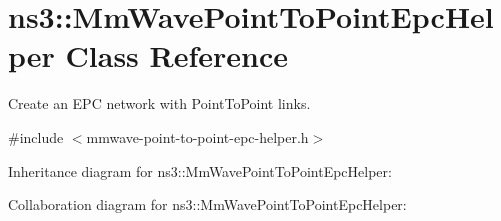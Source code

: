 \hypertarget{classns3_1_1MmWavePointToPointEpcHelper}{}\section{ns3\+:\+:Mm\+Wave\+Point\+To\+Point\+Epc\+Helper Class Reference}
\label{classns3_1_1MmWavePointToPointEpcHelper}


Create an E\+PC network with Point\+To\+Point links.  




{\ttfamily \#include $<$mmwave-\/point-\/to-\/point-\/epc-\/helper.\+h$>$}



Inheritance diagram for ns3\+:\+:Mm\+Wave\+Point\+To\+Point\+Epc\+Helper\+:


Collaboration diagram for ns3\+:\+:Mm\+Wave\+Point\+To\+Point\+Epc\+Helper\+:
